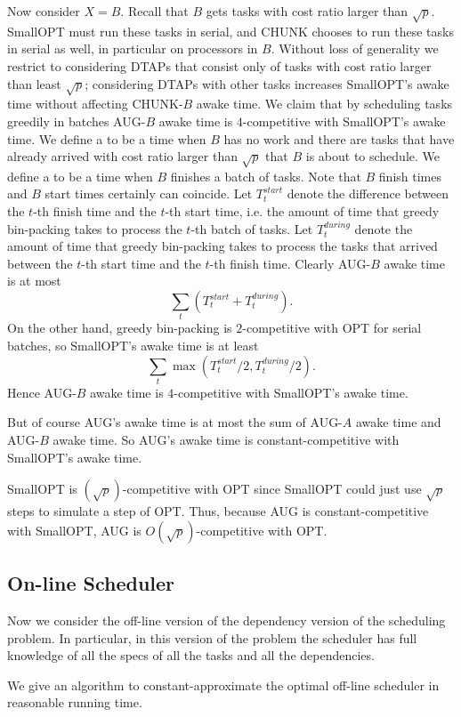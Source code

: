 Now consider $X=B$. Recall that $B$ gets tasks with cost ratio
larger than $\sqrt{p}$. SmallOPT must run these tasks in serial,
and CHUNK chooses to run these tasks in serial as well, in
particular on processors in $B$. Without loss of generality we
restrict to considering DTAPs that consist only of tasks with
cost ratio larger than least $\sqrt{p}$; considering DTAPs with
other tasks increases SmallOPT's awake time without affecting
CHUNK-$B$ awake time. We claim that by scheduling tasks greedily
in batches AUG-$B$ awake time is $4$-competitive with SmallOPT's
awake time. We define a  to be a time when
$B$ has no work and there are tasks that have already arrived
with cost ratio larger than $\sqrt{p}$ that $B$ is about to
schedule. We define a  to be a time when
$B$ finishes a batch of tasks. Note that $B$ finish times and $B$
start times certainly can coincide. 
{\color{red} %
Let $T_t^{start}$ denote the
difference between the $t$-th finish time and the $t$-th start
time, i.e. the amount of time that greedy bin-packing takes to
process the $t$-th batch of tasks. Let $T_t^{during}$ denote the
amount of time that greedy bin-packing takes to process the tasks
that arrived between the $t$-th start time and the $t$-th finish
time. Clearly AUG-$B$ awake time is at most 
$$\sum_{t} \left(T_t^{start} + T_t^{during}\right).$$
On the other hand, greedy bin-packing is $2$-competitive with OPT
for serial batches, so SmallOPT's awake time is at least 
$$\sum_{t} \max(T_t^{start}/2, T_t^{during}/2).$$
Hence AUG-$B$ awake time is $4$-competitive with SmallOPT's awake time.
}

But of course AUG's awake time is at most the sum of AUG-$A$
awake time and AUG-$B$ awake time. So AUG's awake time is
constant-competitive with SmallOPT's awake time.

SmallOPT is $(\sqrt{p})$-competitive with OPT since SmallOPT
could just use $\sqrt{p}$ steps to simulate a step of OPT. Thus,
because AUG is constant-competitive with SmallOPT, AUG is
$O(\sqrt{p})$-competitive with OPT. 

\subsection{On-line Scheduler}
Now we consider the off-line version of the dependency version of
the scheduling problem. In particular, in this version of the
problem the scheduler has full knowledge of all the specs of all
the tasks and all the dependencies.

We give an algorithm to constant-approximate the optimal off-line
scheduler in reasonable running time.

